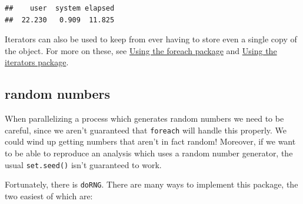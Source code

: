 \documentclass[]{article}
\newenvironment{Shaded}{\begin{snugshade}}{\end{snugshade}}
\newcommand{\KeywordTok}[1]{\textcolor[rgb]{0.13,0.29,0.53}{\textbf{{#1}}}}
\newcommand{\DataTypeTok}[1]{\textcolor[rgb]{0.13,0.29,0.53}{{#1}}}
\newcommand{\DecValTok}[1]{\textcolor[rgb]{0.00,0.00,0.81}{{#1}}}
\newcommand{\StringTok}[1]{\textcolor[rgb]{0.31,0.60,0.02}{{#1}}}
\newcommand{\OtherTok}[1]{\textcolor[rgb]{0.56,0.35,0.01}{{#1}}}
\newcommand{\NormalTok}[1]{{#1}}
\begin{document}
\begin{Shaded}
\end{Shaded}

\begin{verbatim}
##    user  system elapsed 
##  22.230   0.909  11.825
\end{verbatim}

Iterators can also be used to keep from ever having to store even a
single copy of the object. For more on these, see
\href{http://cran.r-project.org/web/packages/foreach/vignettes/foreach.pdf}{Using
the foreach package} and
\href{http://cran.r-project.org/web/packages/iterators/vignettes/iterators.pdf}{Using
the iterators package}.

\subsection{random numbers}\label{random-numbers}

When parallelizing a process which generates random numbers we need to
be careful, since we aren't guaranteed that \texttt{foreach} will handle
this properly. We could wind up getting numbers that aren't in fact
random! Moreover, if we want to be able to reproduce an analysis which
uses a random number generator, the usual \texttt{set.seed()} isn't
guaranteed to work.

Fortunately, there is \texttt{doRNG}. There are many ways to implement
this package, the two easiest of which are:
\end{document}
